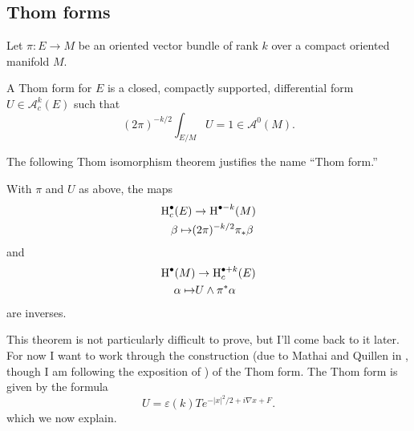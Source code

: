 \documentclass{amsart}
\begin{document}
\subsection{Thom forms}
Let $\pi:E\to M$ be an oriented vector bundle of rank $k$ over a compact oriented
manifold $M$.
\begin{definition}
    A Thom form for $E$ is a closed, compactly supported, differential form
    $U\in \mathcal{A}^k_c(E)$ such that
    \begin{equation*}
        (2\pi)^{-k/2}\int_{E/M} U = 1 \in \mathcal{A}^0(M).
    \end{equation*}
\end{definition}
The following Thom isomorphism theorem justifies the name ``Thom form.''
\begin{theorem}
    With $\pi$ and $U$ as above, the maps
    \begin{align*}
        \operatorname{H}^\bullet_c(E) & \to \operatorname{H}^{\bullet-k}(M)\\
        \beta \mapsto & (2\pi)^{-k/2}\pi_*\beta
    \end{align*}
    and
    \begin{align*}
        \operatorname{H}^\bullet(M) &\to \operatorname{H}^{\bullet+k}_c(E)\\
        \alpha \mapsto & U\wedge \pi^*\alpha
    \end{align*}
    are inverses.
\end{theorem}

This theorem is not particularly difficult to prove, but I'll come back to it
later.
For now I want to work through the construction (due to Mathai and Quillen
in \cite{mq}, though I am following the exposition of \cite{bgv}) of the Thom form.
The Thom form is given by the formula
\begin{equation*}
    U = \varepsilon(k) Te^{-|x|^2/2+i\nabla x+F}.
\end{equation*}
which we now explain.
\end{document}
